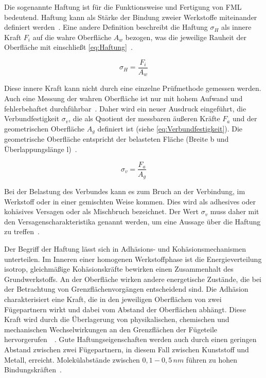 Die sogenannte Haftung ist für die Funktionsweise und Fertigung von FML bedeutend.
Haftung kann als Stärke der Bindung zweier Werkstoffe miteinander definiert werden~\cite{Mann.1994}.
Eine andere Definition beschreibt die Haftung $\sigma_H$ als innere Kraft $F_i$ auf die wahre Oberfläche $A_w$ bezogen, was die jeweilige Rauheit der Oberfläche mit einschließt \autoref{eq:Haftung}~\cite{Bischof.1993}.

\begin{equation}
    \sigma_H = \frac{F_i}{A_w}
    \label{eq:Haftung}
\end{equation}

Diese innere Kraft kann nicht durch eine einzelne Prüfmethode gemessen werden.
Auch eine Messung der wahren Oberfläche ist nur mit hohem Aufwand und fehlerbehaftet durchführbar~\cite{Brockmann.1969}.
Daher wird ein neuer Ausdruck eingeführt, die Verbundfestigkeit $\sigma_v$, die als Quotient der messbaren äußeren Kräfte $F_a$ und der geometrischen Oberfläche $A_g$ definiert ist (siehe \autoref{eq:Verbundfestigkeit}).
Die geometrische Oberfläche entspricht der belasteten Fläche (Breite b und Überlappungslänge l)~\cite{Habenicht.2009}.

\begin{equation}
    \sigma_v = \frac{F_a}{A_g}
    \label{eq:Verbundfestigkeit}
\end{equation}

Bei der Belastung des Verbundes kann es zum Bruch an der Verbindung, im Werkstoff oder in einer gemischten Weise kommen.
Dies wird als adhesives oder kohäsives Versagen oder als Mischbruch bezeichnet.
Der Wert $\sigma_v$ muss daher mit den Versagenscharakteristika genannt werden, um eine Aussage über die Haftung zu treffen~\cite{Pan.2016}.

Der Begriff der Haftung lässt sich in Adhäsions- und Kohäsionsmechanismen unterteilen.
Im Inneren einer homogenen Werkstoffphase ist die Energieverteilung isotrop, gleichmäßige Kohäsionskräfte bewirken einen Zusammenhalt des Grundwerkstoffs.
An der Oberfläche wirken andere energetische Zustände, die bei der Betrachtung von Grenzflächenvorgängen entscheidend sind.
Die Adhäsion charakterisiert eine Kraft, die in den jeweiligen Oberflächen von zwei Fügepartnern wirkt und dabei vom Abstand der Oberflächen abhängt.
Diese Kraft wird durch die Überlagerung von physikalischen, chemischen und mechanischen Wechselwirkungen an den Grenzflächen der Fügeteile hervorgerufen~\cite{Habenicht.2009}~.
Gute Haftungseigenschaften werden auch durch einen geringen Abstand zwischen zwei Fügepartnern, in diesem Fall zwischen Kunststoff und Metall, erreicht.
Molekülabstände zwischen $0,1 - 0,5\, nm$ führen zu hohen Bindungskräften~\cite{Suchentrunk.2007}.

